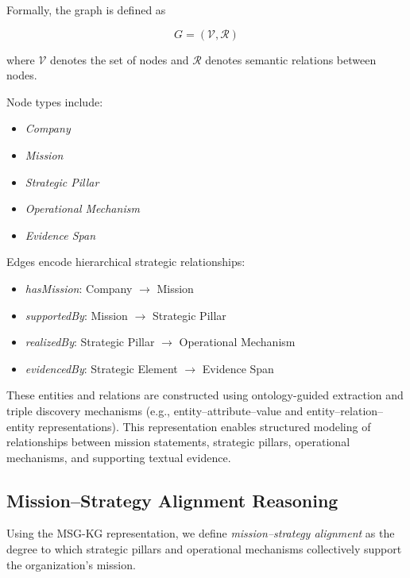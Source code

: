 \documentclass[11pt]{article}
\begin{document}
Formally, the graph is defined as

\begin{equation}
G = (\mathcal{V}, \mathcal{R})
\end{equation}

where $\mathcal{V}$ denotes the set of nodes and $\mathcal{R}$ denotes semantic relations between nodes.

Node types include:

\begin{itemize}[leftmargin=1.0em, itemsep=0.05em, topsep=0.05em]
\item \textit{Company}
\item \textit{Mission}
\item \textit{Strategic Pillar}
\item \textit{Operational Mechanism}
\item \textit{Evidence Span}
\end{itemize}

Edges encode hierarchical strategic relationships:

\begin{itemize}[leftmargin=1.0em, itemsep=0.05em, topsep=0.05em]
\item \textit{hasMission}: Company $\rightarrow$ Mission
\item \textit{supportedBy}: Mission $\rightarrow$ Strategic Pillar
\item \textit{realizedBy}: Strategic Pillar $\rightarrow$ Operational Mechanism
\item \textit{evidencedBy}: Strategic Element $\rightarrow$ Evidence Span
\end{itemize}

These entities and relations are constructed using ontology-guided extraction and triple discovery mechanisms (e.g., entity--attribute--value and entity--relation--entity representations). This representation enables structured modeling of relationships between mission statements, strategic pillars, operational mechanisms, and supporting textual evidence.

\subsection{Mission--Strategy Alignment Reasoning}

Using the MSG-KG representation, we define \textit{mission--strategy alignment} as the degree to which strategic pillars and operational mechanisms collectively support the organization’s mission.
\end{document}
